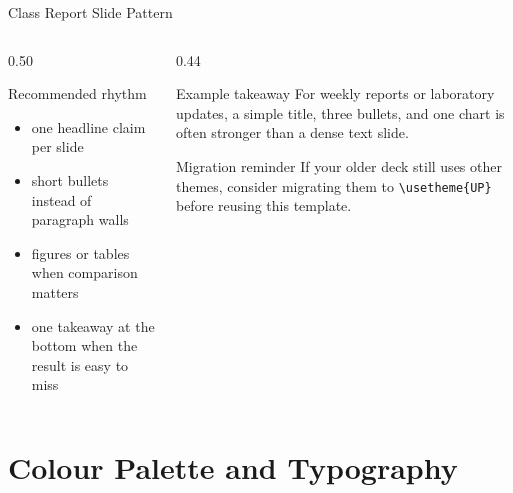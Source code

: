 \documentclass[aspectratio=169]{beamer}
\begin{document}
\begin{frame}{Class Report Slide Pattern}
  \begin{columns}[T]
    \begin{column}{0.50\textwidth}
      \begin{block}{Recommended rhythm}
        \begin{itemize}
          \item one headline claim per slide
          \item short bullets instead of paragraph walls
          \item figures or tables when comparison matters
          \item one takeaway at the bottom when the result is easy to miss
        \end{itemize}
      \end{block}
    \end{column}
    \begin{column}{0.44\textwidth}
      \begin{exampleblock}{Example takeaway}
        For weekly reports or laboratory updates, a simple title, three bullets, and one
        chart is often stronger than a dense text slide.
      \end{exampleblock}
      \vskip 6pt
      \begin{alertblock}{Migration reminder}
        If your older deck still uses other themes, consider migrating them to
        \texttt{\textbackslash usetheme\{UP\}} before reusing this template.
      \end{alertblock}
    \end{column}
  \end{columns}
\end{frame}

\section{Colour Palette and Typography}
\end{document}
